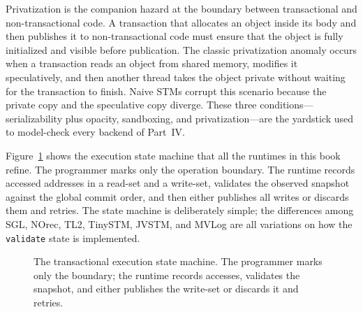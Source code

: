 Privatization is the companion hazard at the boundary between transactional
and non-transactional code. A transaction that allocates an object inside its
body and then publishes it to non-transactional code must ensure that the
object is fully initialized and visible before publication. The classic
privatization anomaly occurs when a transaction reads an object from shared
memory, modifies it speculatively, and then another thread takes the object
private without waiting for the transaction to finish. Naive STMs corrupt this
scenario because the private copy and the speculative copy diverge. These three
conditions---serializability plus opacity, sandboxing, and privatization---are
the yardstick used to model-check every backend of Part~IV.

Figure~\ref{fig:transactional-state-machine} shows the execution state machine
that all the runtimes in this book refine. The programmer marks only the
operation boundary. The runtime records accessed addresses in a read-set and a
write-set, validates the observed snapshot against the global commit order, and
then either publishes all writes or discards them and retries. The state
machine is deliberately simple; the differences among SGL, NOrec, TL2,
TinySTM, JVSTM, and MVLog are all variations on how the
\texttt{validate} state is implemented.

\begin{figure}[htbp]
\centering
{}
\caption{The transactional execution state machine. The programmer marks
only the boundary; the runtime records accesses, validates the snapshot,
and either publishes the write-set or discards it and retries.}
\label{fig:transactional-state-machine}
\end{figure}

